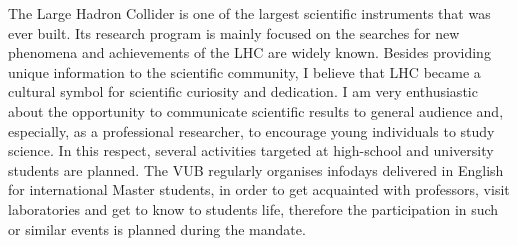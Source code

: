 The Large Hadron Collider is one of the largest scientific instruments that was ever built. Its research program is mainly focused on the searches for new phenomena and achievements of the LHC are widely known. Besides providing unique information to the scientific community, I believe that LHC became a cultural symbol for scientific curiosity and dedication. I am very enthusiastic about the opportunity to communicate scientific results to general audience and, especially, as a professional researcher, to encourage young individuals to study science. In this respect, several activities targeted at high-school and university students are planned. The VUB regularly organises infodays delivered in English for international Master students, in order to get acquainted with professors, visit laboratories and get to know to students life, therefore the participation in such or similar events is planned during the mandate.